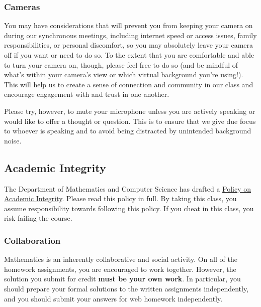 \documentclass[11pt]{amsart}
\begin{document}
\subsubsection*{Cameras}
You may have considerations that will prevent you from keeping your camera on during our synchronous meetings, including internet speed or access issues, family responsibilities, or personal discomfort, so you may absolutely leave your camera off if you want or need to do so. To the extent that you are comfortable and able to turn your camera on, though, please feel free to do so (and be mindful of what's within your camera's view or which virtual background you're using!). This will help us to create a sense of connection and community in our class and encourage engagement with and trust in one another.

Please try, however, to mute your microphone unless you are actively speaking or would like to offer a thought or question. This is to ensure that we give due focus to whoever is speaking and to avoid being distracted by unintended background noise.


\subsection*{Academic Integrity}
The Department of Mathematics and Computer Science has drafted a
\href{https://www.holycross.edu/academics/programs/mathematics-and-computer-science/node/211581/academic-integrity}{Policy on Academic Integrity}.
Please read this policy in full. By taking this class, you assume responsibility towards following this policy.
If you cheat in this class, you risk failing the course.

\subsubsection*{Collaboration} Mathematics is an inherently collaborative and social activity. On all of the homework assignments, you are encouraged to work together.
However, the solution you submit for credit \textbf{must be your own work}.
In particular, you should prepare your formal solutions to the written assignments independently,
and you should submit your answers for web homework independently.
\end{document}
